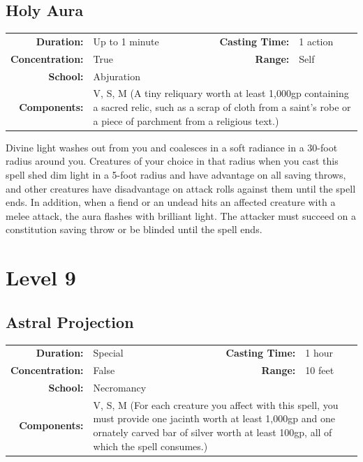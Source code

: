 \documentclass[12pt,showtrims]{memoir}
\begin{document}
\newpage
\section*{Holy Aura}

{
\small\centering\vspace{-6pt}
\begin{tabular}{rlrl}
\toprule

\textbf{Duration:} & Up to 1 minute &
\textbf{Casting Time:} & 1 action \\
\textbf{Concentration:} & True &
\textbf{Range:} & Self \\
\textbf{School:} & Abjuration \\
\textbf{Components:} & \multicolumn{3}{p{0.7\textwidth}}{V, S, M (A tiny reliquary worth at least 1,000gp containing a sacred relic, such as a scrap of cloth from a saint's robe or a piece of parchment from a religious text.)}\\

\bottomrule
\end{tabular}
}

\vspace{1\baselineskip}\noindent Divine light washes out from you and coalesces in a soft radiance in a 30-foot radius around you. Creatures of your choice in that radius when you cast this spell shed dim light in a 5-foot radius and have advantage on all saving throws, and other creatures have disadvantage on attack rolls against them until the spell ends. In addition, when a fiend or an undead hits an affected creature with a melee attack, the aura flashes with brilliant light. The attacker must succeed on a constitution saving throw or be blinded until the spell ends.

\newpage
\chapter*{Level 9} 
\section*{Astral Projection}

{
\small\centering\vspace{-6pt}
\begin{tabular}{rlrl}
\toprule

\textbf{Duration:} & Special &
\textbf{Casting Time:} & 1 hour \\
\textbf{Concentration:} & False &
\textbf{Range:} & 10 feet \\
\textbf{School:} & Necromancy \\
\textbf{Components:} & \multicolumn{3}{p{0.7\textwidth}}{V, S, M (For each creature you affect with this spell, you must provide one jacinth worth at least 1,000gp and one ornately carved bar of silver worth at least 100gp, all of which the spell consumes.)}\\

\bottomrule
\end{tabular}
}
\end{document}
